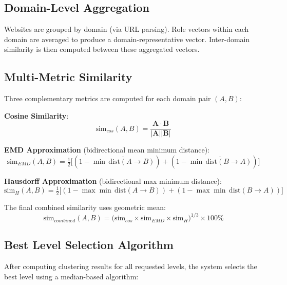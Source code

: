 \subsection{Domain-Level Aggregation}

Websites are grouped by domain (via URL parsing). Role vectors within each domain are averaged to produce a domain-representative vector. Inter-domain similarity is then computed between these aggregated vectors.

\subsection{Multi-Metric Similarity}

Three complementary metrics are computed for each domain pair $(A, B)$:

\textbf{Cosine Similarity}:
\begin{equation}
\text{sim}_{cos}(A,B) = \frac{\mathbf{A} \cdot \mathbf{B}}{|\mathbf{A}||\mathbf{B}|}
\end{equation}

\textbf{EMD Approximation} (bidirectional mean minimum distance):
\begin{equation}
\text{sim}_{EMD}(A,B) = \tfrac{1}{2}\bigl[(1 - \overline{\min\,\text{dist}(A \to B)}) + (1 - \overline{\min\,\text{dist}(B \to A)})\bigr]
\end{equation}

\textbf{Hausdorff Approximation} (bidirectional max minimum distance):
\begin{equation}
\text{sim}_{H}(A,B) = \tfrac{1}{2}\bigl[(1 - \max\min\,\text{dist}(A \to B)) + (1 - \max\min\,\text{dist}(B \to A))\bigr]
\end{equation}

The final combined similarity uses geometric mean:
\begin{equation}
\text{sim}_{combined}(A,B) = \bigl(\text{sim}_{cos} \times \text{sim}_{EMD} \times \text{sim}_{H}\bigr)^{1/3} \times 100\%
\end{equation}

\subsection{Best Level Selection Algorithm}

After computing clustering results for all requested levels, the system selects the best level using a median-based algorithm:

